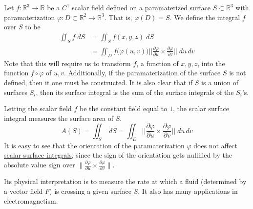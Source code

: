  \begin{definition}
    \label{def:scalar-surface-integrals}
		Let $f: \mathbb{R}^3 \to \mathbb{R}$ be a $C^1$ scalar field defined on a paramaterized surface $S \subset \mathbb{R}^3$ with paramaterization $\varphi: D \subset \mathbb{R}^2 \to \mathbb{R}^3$. That is, $\varphi(D) = S$. We define the integral $f$ over $S$ to be
		\begin{align}
			\iint_S f \; dS & = \iint_S f(x, y, z) \; dS \\
			& = \iint_D f\big( \varphi(u, v)\big) \bigg|\bigg|\frac{\partial \varphi}{\partial u} \times \frac{\partial \varphi}{\partial v}\bigg|\bigg| \; du \,dv
		\end{align}
		Note that this will require us to transform $f$, a function of $x, y, z$, into the function $f \circ \varphi$ of $u, v$. Additionally, if the paramaterization of the surface $S$ is not defined, then it one must be constructed. It is also clear that if $S$ is a union of surfaces $S_i$, then its surface integral is the sum of the surface integrals of the $S_i$'s. 
  \end{definition}
		
  Letting the scalar field $f$ be the constant field equal to $1$, the scalar surface integral measures the surface area of $S$. 
  \begin{equation}
    A(S) = \iint_S \; dS = \iint_D \Big|\Big|\frac{\partial \varphi}{\partial u} \times \frac{\partial \varphi}{\partial v}\Big|\Big| \; du\, dv
  \end{equation}
  It is easy to see that the orientation of the paramaterization $\varphi$ does not affect \hyperref[def:scalar-surface-integrals]{scalar surface integrals}, since the sign of the orientation gets nullified by the absolute value sign over $\|\frac{\partial \varphi}{\partial u} \times \frac{\partial \varphi}{\partial v}\|$. 
		
  Its physical interpretation is to measure the rate at which a fluid (determined by a vector field $F$) is crossing a given surface $S$. It also has many applications in electromagnetism. 
		
